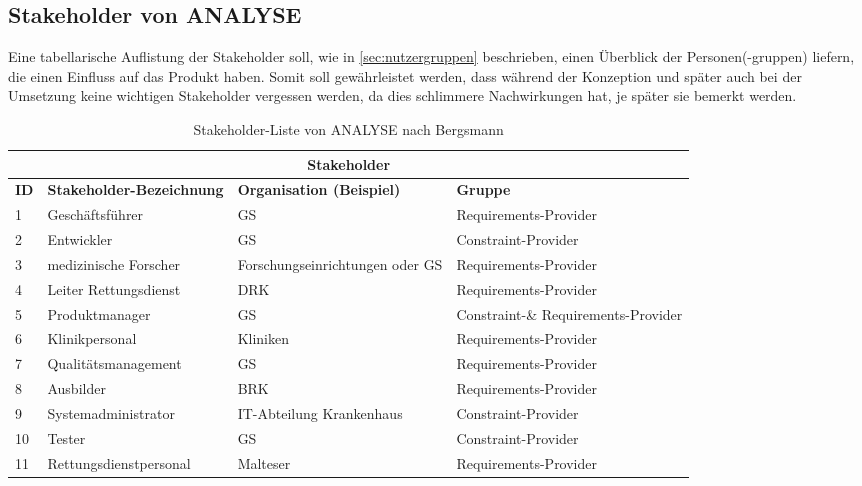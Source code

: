 \subsection{Stakeholder von \acrlong*{ANALYSE}}
\label{subsec:stakeholder}
Eine tabellarische Auflistung der Stakeholder soll, wie in \ref{sec:nutzergruppen} beschrieben, einen Überblick der Personen(-gruppen) liefern, die einen Einfluss auf das Produkt haben.
Somit soll gewährleistet werden, dass während der Konzeption und später auch bei der Umsetzung keine wichtigen Stakeholder vergessen werden, da dies schlimmere Nachwirkungen hat, je später sie bemerkt werden.


\begin{table}[htb]
\centering
\setlength{\extrarowheight}{4pt}
\begin{tabular}{ |p{0.5cm} | p{4cm} | p{5.5cm} |p{4cm} |}
  \hline
	\multicolumn{4}{|c|}{\textbf{Stakeholder}} \\
  \hline
\textbf{ID} & \textbf{Stakeholder-Bezeichnung} 	& \textbf{Organisation (Beispiel)} & \textbf{Gruppe}
  \\\hline
  1			& Geschäftsführer 					& \gls{GS} 				& Requirements-Provider
  \\\hline  
  2			& Entwickler 						& \gls{GS} 				& Constraint-Provider
  \\\hline
  3			& medizinische Forscher 			& Forschungseinrichtungen oder \gls{GS} & Requirements-Provider
  \\\hline
  4			& Leiter Rettungsdienst				& \gls{DRK}				& Requirements-Provider
  \\\hline
  5			& Produktmanager 					& \gls{GS} 				& Constraint-\& Requirements-Provider
  \\\hline
  6			& Klinikpersonal					& Kliniken			& Requirements-Provider
  \\\hline
  7			& Qualitätsmanagement 				& \gls{GS} 				& Requirements-Provider
  \\\hline
  8			& Ausbilder 						& \gls{BRK}	 			& Requirements-Provider
  \\\hline
  9			& Systemadministrator 				& IT-Abteilung Krankenhaus				& Constraint-Provider
  \\\hline  
  10		& Tester 							& \gls{GS} 				& Constraint-Provider
  \\\hline
  11		& Rettungsdienstpersonal			& Malteser				& Requirements-Provider
  \\\hline
\end{tabular} 
  \caption[Stakeholder-Liste \acrlong*{ANALYSE}]{Stakeholder-Liste von \gls{ANALYSE} nach Bergsmann \cite[S. 85]{Bergsmann.2018}}
  \label{tbl:Stakeholder-Liste}
\end{table}

